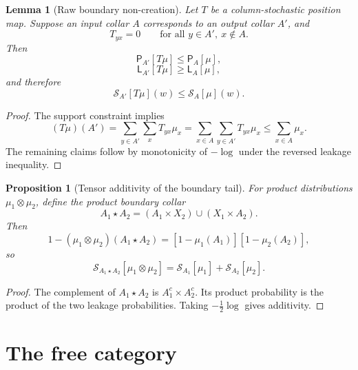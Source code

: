 \documentclass[11pt]{article}
\newtheorem{proposition}{Proposition}
\newtheorem{lemma}{Lemma}
\begin{document}
\begin{lemma}[Raw boundary non-creation]
Let \(T\) be a column-stochastic position map. Suppose an input collar \(A\) corresponds to an output collar \(A'\), and
\[
T_{yx}=0
\qquad
\text{for all }y\in A',\ x\notin A.
\]
Then
\[
\mathsf P_{A'}[T\mu]\le\mathsf P_A[\mu],
\]
\[
\mathsf L_{A'}[T\mu]\ge\mathsf L_A[\mu],
\]
and therefore
\[
\mathcal S_{A'}[T\mu](w)
\le
\mathcal S_A[\mu](w).
\]
\end{lemma}

\begin{proof}
The support constraint implies
\[
(T\mu)(A')
=\sum_{y\in A'}\sum_xT_{yx}\mu_x
=\sum_{x\in A}\sum_{y\in A'}T_{yx}\mu_x
\le \sum_{x\in A}\mu_x.
\]
The remaining claims follow by monotonicity of \(-\log\) under the reversed leakage inequality.
\end{proof}

\begin{proposition}[Tensor additivity of the boundary tail]
For product distributions \(\mu_1\otimes\mu_2\), define the product boundary collar
\[
A_1\star A_2
=(A_1\times X_2)\cup(X_1\times A_2).
\]
Then
\[
1-(\mu_1\otimes\mu_2)(A_1\star A_2)
=
[1-\mu_1(A_1)][1-\mu_2(A_2)],
\]
so
\[
\mathcal S_{A_1\star A_2}[\mu_1\otimes\mu_2]
=
\mathcal S_{A_1}[\mu_1]+
\mathcal S_{A_2}[\mu_2].
\]
\end{proposition}

\begin{proof}
The complement of \(A_1\star A_2\) is \(A_1^c\times A_2^c\). Its product probability is the product of the two leakage probabilities. Taking \(-\frac12\log\) gives additivity.
\end{proof}

\section{The free category}
\label{sec:free}
\end{document}
